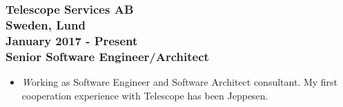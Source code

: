 \documentclass[10pt,a4paper]{article}
\begin{document}
\subsubsection{{\large Telescope Services AB} \\ \textnormal{Sweden, Lund} \\ \textnormal{January 2017 - Present} \\ {Senior Software Engineer/Architect}}
  \setlength{\leftskip}{0.5cm}
  \setlength{\rightskip}{1cm}
  \begin{itemize}
    \setlength{\rightskip}{1cm}
    \setlength\itemsep{0em}
    \item \small \textit Working as Software Engineer and Software Architect consultant. My first cooperation experience with Telescope has been Jeppesen.
  \end{itemize}
  \setlength{\leftskip}{0pt}
  \setlength{\rightskip}{0cm}
  
\end{document}
